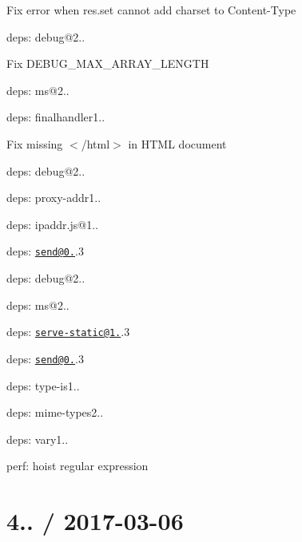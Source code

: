 
\begin{DoxyItemize}
\item Fix error when {\ttfamily res.\+set} cannot add charset to {\ttfamily Content-\/\+Type}
\item deps\+: debug@2..
\begin{DoxyItemize}
\item Fix {\ttfamily D\+E\+B\+U\+G\+\_\+\+M\+A\+X\+\_\+\+A\+R\+R\+A\+Y\+\_\+\+L\+E\+N\+G\+TH}
\item deps\+: ms@2..
\end{DoxyItemize}
\item deps\+: finalhandler1..
\begin{DoxyItemize}
\item Fix missing {\ttfamily $<$/html$>$} in H\+T\+ML document
\item deps\+: debug@2..
\end{DoxyItemize}
\item deps\+: proxy-\/addr1..
\begin{DoxyItemize}
\item deps\+: ipaddr.\+js@1..
\end{DoxyItemize}
\item deps\+: \href{mailto:send@0.15}{\tt send@0.}.3
\begin{DoxyItemize}
\item deps\+: debug@2..
\item deps\+: ms@2..
\end{DoxyItemize}
\item deps\+: \href{mailto:serve-static@1.12}{\tt serve-\/static@1.}.3
\begin{DoxyItemize}
\item deps\+: \href{mailto:send@0.15}{\tt send@0.}.3
\end{DoxyItemize}
\item deps\+: type-\/is1..
\begin{DoxyItemize}
\item deps\+: mime-\/types2..
\end{DoxyItemize}
\item deps\+: vary1..
\begin{DoxyItemize}
\item perf\+: hoist regular expression
\end{DoxyItemize}
\end{DoxyItemize}

\section*{4.. / 2017-\/03-\/06 }


